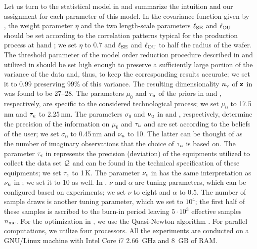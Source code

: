 Let us turn to the statistical model in  and summarize the intuition and our assignment for each parameter of this model.
In the covariance function given by , the weight parameter $\eta$ and the two length-scale parameters $\ell_{\text{SE}}$ and $\ell_{\text{OU}}$ should be set according to the correlation patterns typical for the production process at hand \cite{chandrakasan2001, cheng2011}; we set $\eta$ to 0.7 and $\ell_{\text{SE}}$ and $\ell_{\text{OU}}$ to half the radius of the wafer.
The threshold parameter of the model order reduction procedure described in  and utilized in  should be set high enough to preserve a sufficiently large portion of the variance of the data and, thus, to keep the corresponding results accurate; we set it to 0.99 preserving 99\% of this variance. The resulting dimensionality ${n_\text{v}}$ of $\mathbf{z}$ in  was found to be 27--28.
The parameters $\mu_0$ and $\tau_u$ of the priors in  and , respectively, are specific to the considered technological process; we set $\mu_0$ to 17.5$\,$nm and $\tau_u$ to 2.25$\,$nm.
The parameters $\sigma_0$ and $\nu_u$ in  and , respectively, determine the precision of the information on $\mu_0$ and $\tau_u$ and are set according to the beliefs of the user; we set $\sigma_0$ to 0.45$\,$nm and $\nu_u$ to 10.
The latter can be thought of as the number of imaginary observations that the choice of $\tau_u$ is based on.
The parameter $\tau_\epsilon$ in  represents the precision (deviation) of the equipments utilized to collect the data set $\mathcal{Q}$ and can be found in the technical specification of these equipments; we set $\tau_\epsilon$ to 1$\,$K. The parameter $\nu_\epsilon$ in  has the same interpretation as $\nu_u$ in ; we set it to 10 as well.
In , $\nu$ and $\alpha$ are tuning parameters, which can be configured based on experiments; we set $\nu$ to eight and $\alpha$ to 0.5.
The number of sample draws is another tuning parameter, which we set to $10^4$; the first half of these samples is ascribed to the burn-in period leaving $5 \cdot 10^3$ effective samples ${n_\text{mc}}$.
For the optimization in , we use the Quasi-Newton algorithm \cite{press2007}.
For parallel computations, we utilize four processors.
All the experiments are conducted on a GNU/Linux machine with Intel Core i7 2.66~GHz and 8~GB of RAM.

